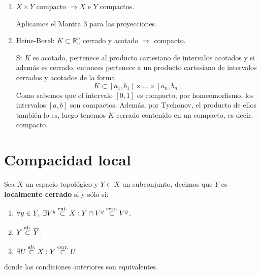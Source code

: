 \begin{obs}
\begin{enumerate}
    \item $X \times Y$ compacto $\Rightarrow X$ e $Y$ compactos.\begin{demo}
        Aplicamos el Mantra $3$ para las proyecciones.
    \end{demo} 
    \item Heine-Borel: $K \subset \mathbb{R}_u^n$ cerrado y acotado $\Rightarrow$ compacto.
    \begin{demo}
    Si $K$ es acotado, pertenece al producto cartesiano de intervalos acotados y si además es cerrado, entonces pertenece a un producto cartesiano de intervalos cerrados y acotados de la forma
    \[
	K \subset \left[ a_1, b_1 \right] \times \ldots \times \left[ a_n, b_n \right]
    \]
    Como sabemos que el intervalo $[0,1]$ es compacto, por homeomorfismo, los intervalos $[a,b]$ son compactos. Además, por Tychonov, el producto de ellos también lo es, luego tenemos $K$ cerrado contenido en un compacto, es decir, compacto.
    \end{demo}
\end{enumerate}
\end{obs}


\chapter{Compacidad local}%
\label{cha:compacidad_local}

\begin{defi}
Sea $X$ un espacio topológico y $Y \subset X$ un subconjunto, decimos que $Y$ es \textbf{localmente cerrado} si y sólo si:
\begin{enumerate}
    \item $\forall y \in Y,\ \exists V^y \stackrel{\text{ent.}}{\subset} X: Y \cap V^y \stackrel{\text{cerr.}}{\subset} V^y$.
    \item $Y \stackrel{\text{ab.}}{\subset} \overline{Y}$.
    \item $\exists U \stackrel{\text{ab.}}{\subset} X : Y \stackrel{\text{cerr.}}{\subset} U$
\end{enumerate}
donde las condiciones anteriores son equivalentes.
\end{defi}


